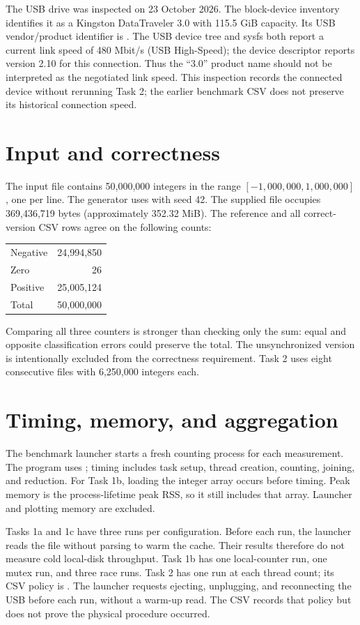 \documentclass{../latex/utmreport}
\begin{document}
The USB drive was inspected on 23 October 2026. The block-device inventory
identifies it as a Kingston DataTraveler 3.0 with 115.5 GiB capacity.
Its USB vendor/product identifier is . The USB device tree
and sysfs both report a current link speed of 480 Mbit/s (USB High-Speed);
the device descriptor reports version 2.10 for this connection. Thus the
``3.0'' product name should not be interpreted as the negotiated link speed.
This inspection records the connected device without rerunning Task 2;
the earlier benchmark CSV does not preserve its historical connection speed.

\section{Input and correctness}
The input file contains 50,000,000 integers in the range $[-1,000,000,1,000,000]$,
one per line. The generator uses  with seed 42. The supplied
file occupies 369,436,719 bytes (approximately 352.32 MiB).
The reference and all correct-version CSV rows agree on the following counts:
\begin{center}
\begin{tabular}{lr}
Negative & 24,994,850 \\
Zero & 26 \\
Positive & 25,005,124 \\\hline
Total & 50,000,000 \\
\end{tabular}
\end{center}
Comparing all three counters is stronger than checking only the sum: equal
and opposite classification errors could preserve the total. The unsynchronized
version is intentionally excluded from the correctness requirement. Task 2
uses eight consecutive files with 6,250,000 integers each.

\section{Timing, memory, and aggregation}
The benchmark launcher starts a fresh counting process for each measurement.
The program uses ; timing includes task setup, thread
creation, counting, joining, and reduction. For Task 1b, loading the integer
array occurs before timing. Peak memory is the process-lifetime peak RSS,
so it still includes that array. Launcher and plotting memory are excluded.

Tasks 1a and 1c have three runs per configuration. Before each run, the launcher
reads the file without parsing to warm the cache. Their results therefore do
not measure cold local-disk throughput. Task 1b has one local-counter run,
one mutex run, and three race runs. Task 2 has one run at each thread count;
its CSV policy is . The launcher requests ejecting,
unplugging, and reconnecting the USB before each run, without a warm-up read.
The CSV records that policy but does not prove the physical procedure occurred.
\end{document}
